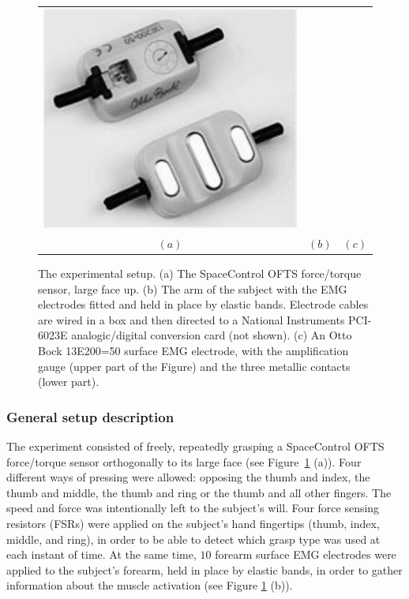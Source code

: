\begin{figure}[!t]
\begin{tabular}{ccc}
    \includegraphics[height=0.16\textheight]{figs/ottobock} \\
    $(a)$ & $(b)$ & $(c)$ \\
  \end{tabular}
  \caption{The experimental setup. (a) The SpaceControl OFTS
    force/torque sensor, large face up. (b)
    The arm of the subject with the EMG electrodes fitted and held in
    place by elastic bands. Electrode cables are wired in a box and
    then directed to a National Instruments PCI-6023E analogic/digital
    conversion card (not shown). (c) An Otto Bock 13E200=50
    surface EMG electrode, with the amplification gauge (upper part of
    the Figure) and the three metallic contacts (lower part).}
  \label{fig:setup}
\end{figure}

\subsubsection{General setup description}

The experiment consisted of freely, repeatedly grasping a SpaceControl
OFTS force/torque sensor \cite{ofts} orthogonally to its large face
(see Figure~\ref{fig:setup} (a)). Four different ways of pressing
were allowed: opposing the thumb and index, the thumb and middle, the
thumb and ring or the thumb and all other fingers. The speed and force
was intentionally left to the subject's will. Four force sensing
resistors (FSRs) were applied on the subject's hand fingertips (thumb,
index, middle, and ring), in order to be able to detect which grasp
type was used at each instant of time. At the same time, $10$ forearm
surface EMG electrodes were applied to the subject's forearm, held in
place by elastic bands, in order to gather information about the
muscle activation (see Figure \ref{fig:setup} (b)).

